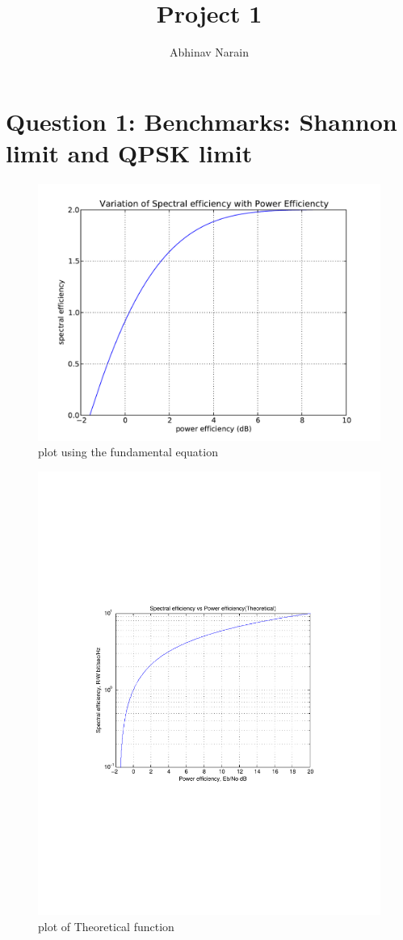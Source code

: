 \documentclass[11pt, english]{article}
\title{ Project 1 }
\date{}
\author{Abhinav Narain}
\begin{document}
\maketitle
\pagebreak
\section{Question 1: Benchmarks: Shannon limit and QPSK limit}
\begin{figure}[H]
    \centering
    \includegraphics[width=.8\textwidth]{real_limit.pdf}
    \caption{plot using the fundamental equation}
    \label{rl}
\end{figure}
\begin{figure}[H]
    \centering
    \includegraphics[width=.8\textwidth]{theoretical_limit.pdf}
    \caption{plot of Theoretical function}
    \label{th1}
\end{figure}
\end{document}
